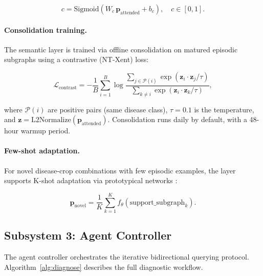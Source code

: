 \documentclass{article}
\begin{document}
\begin{equation}
c = \text{Sigmoid}\!\left( W_c \,\mathbf{p}_{\text{attended}} + b_c\right),\quad
c \in [0, 1].
\label{eq:confidence}
\end{equation}

\paragraph{Consolidation training.}
The semantic layer is trained via offline consolidation on matured episodic
subgraphs using a contrastive (NT-Xent) loss:

\begin{equation}
\mathcal{L}_{\text{contrast}} = -\frac{1}{B} \sum_{i=1}^{B}
\log \frac{\sum_{j \in \mathcal{P}(i)} \exp(\mathbf{z}_i \cdot \mathbf{z}_j / \tau)}
{\sum_{k \neq i} \exp(\mathbf{z}_i \cdot \mathbf{z}_k / \tau)},
\label{eq:contrastive}
\end{equation}

where $\mathcal{P}(i)$ are positive pairs (same disease class), $\tau = 0.1$ is
the temperature, and $\mathbf{z} = \text{L2Normalize}(\mathbf{p}_{\text{attended}})$.
Consolidation runs daily by default, with a 48-hour warmup period.

\paragraph{Few-shot adaptation.}
For novel disease-crop combinations with few episodic examples, the layer supports
K-shot adaptation via prototypical networks \citep{snell2017}:

\begin{equation}
\mathbf{p}_{\text{novel}} = \frac{1}{K} \sum_{k=1}^{K}
f_{\theta}(\text{support\_subgraph}_k).
\label{eq:fewshot}
\end{equation}

\subsection{Subsystem 3: Agent Controller}

The agent controller orchestrates the iterative bidirectional querying protocol.
Algorithm~\ref{alg:diagnose} describes the full diagnostic workflow.
\end{document}
